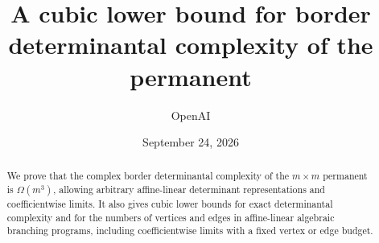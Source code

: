 \documentclass[11pt]{article}
\title{A cubic lower bound for border determinantal complexity of the permanent}
\author{OpenAI}
\date{September 24, 2026}
\numberwithin{equation}{section}
\theoremstyle{definition}
\theoremstyle{remark}
\begin{document}
\maketitle
\begin{abstract}
We prove that the complex border determinantal complexity of the $m\times m$
permanent is $\Omega(m^3)$, allowing arbitrary affine-linear determinant
representations and coefficientwise limits. It also gives cubic lower bounds
for exact determinantal complexity and for the numbers of vertices and edges
in affine-linear algebraic branching programs, including coefficientwise
limits with a fixed vertex or edge budget.
\end{abstract}
\tableofcontents











\end{document}
